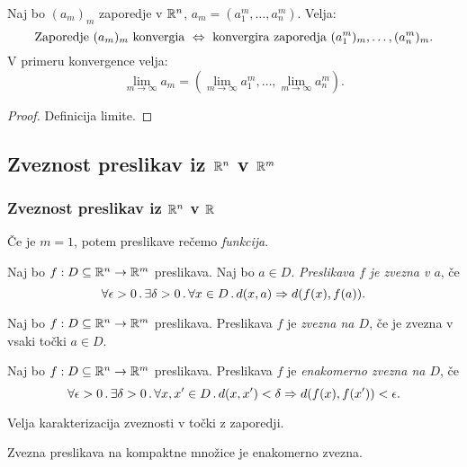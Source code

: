 \begin{trditev}
    Naj bo $(a_m)_m$ zaporedje v $\mathbb{R}^n$, $a_m = (a_1^m, \ldots, a_n^m)$. Velja:
    $$\text{Zaporedje } (a_m)_m \text{ konvergia } \Leftrightarrow \text{ konvergira zaporedja } (a_1^m)_m, \ldots, (a_n^m)_m.$$
    V primeru konvergence velja:
    $$\lim_{m \to \infty} a_m = (\lim_{m \to \infty} a_1^m, \ldots, \lim_{m \to \infty} a_n^m).$$
\end{trditev}

\begin{proof}
    Definicija limite.
\end{proof}

\subsection{Zveznost preslikav iz $\mathbb{R}^n$ v $\mathbb{R}^m$}
\subsubsection{Zveznost preslikav iz $\mathbb{R}^n$ v $\mathbb{R}$}
\begin{opomba}
    Če je $m=1$, potem preslikave rečemo \emph{funkcija}.
\end{opomba}

\begin{definicija}
    Naj bo $f: D \subseteq \mathbb{R}^n \to \mathbb{R}^m$ preslikava. Naj bo $a \in D$. \emph{Preslikava $f$ je zvezna v $a$}, če 
    $$\forall \epsilon > 0 \,.\, \exists \delta >0 \,.\, \forall x \in D \,.\, d(x, a) \Rightarrow d(f(x), f(a)).$$
\end{definicija}

\begin{definicija}
    Naj bo $f: D \subseteq \mathbb{R}^n \to \mathbb{R}^m$ preslikava. Preslikava $f$ je \emph{zvezna na $D$}, če je zvezna v vsaki točki $a \in D$.
\end{definicija}

\begin{definicija}
    Naj bo $f: D \subseteq \mathbb{R}^n \to \mathbb{R}^m$ preslikava. Preslikava $f$ je \emph{enakomerno zvezna na $D$}, če
    $$\forall \epsilon > 0 \,.\, \exists \delta > 0 \,.\, \forall x, x' \in D \,.\, d(x, x') < \delta \Rightarrow d(f(x), f(x')) < \epsilon.$$
\end{definicija}

\begin{opomba}
    Velja karakterizacija zveznosti v točki z zaporedji.
\end{opomba}

\begin{opomba}
    Zvezna preslikava na kompaktne množice je enakomerno zvezna.
\end{opomba}

